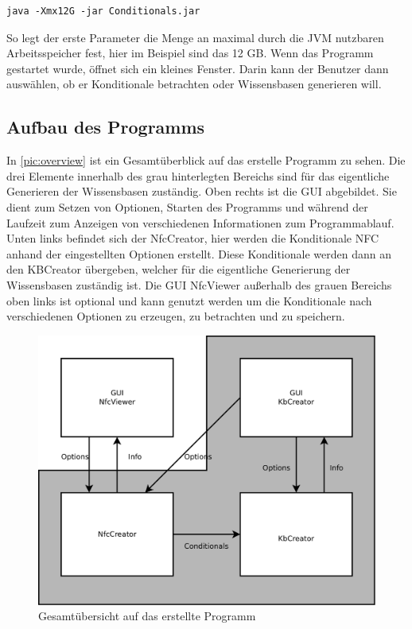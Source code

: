 \documentclass[12pt,a4paper]{article}
\begin{document}
\begin{lstlisting}
java -Xmx12G -jar Conditionals.jar 
\end{lstlisting}

So legt der erste Parameter die Menge an maximal durch die JVM nutzbaren Arbeitsspeicher fest, hier im Beispiel sind das 12 GB. Wenn das Programm gestartet wurde, öffnet sich ein kleines Fenster. Darin kann der Benutzer dann  auswählen, ob er Konditionale betrachten oder Wissensbasen generieren will.






\subsection{Aufbau des Programms}


In \autoref{pic:overview} ist ein Gesamtüberblick auf das erstelle Programm zu sehen. Die drei Elemente innerhalb des grau hinterlegten Bereichs sind für das eigentliche Generieren der Wissensbasen zuständig. Oben rechts ist die GUI abgebildet. Sie dient zum Setzen von Optionen, Starten des Programms und während der Laufzeit zum Anzeigen von verschiedenen Informationen zum Programmablauf. Unten links befindet sich der NfcCreator, hier werden die Konditionale NFC anhand der eingestellten Optionen erstellt. Diese Konditionale werden dann an den KBCreator übergeben, welcher für die eigentliche Generierung der Wissensbasen zuständig ist. Die GUI NfcViewer außerhalb des grauen Bereichs oben links ist optional und kann genutzt werden um die Konditionale nach verschiedenen Optionen zu erzeugen, zu betrachten und zu speichern.

\begin{figure}
\includegraphics[width=0.7\linewidth]{bilder/overview.png}

\caption{Gesamtübersicht auf das erstellte Programm}
\label{pic:overview}
\end{figure}
\end{document}
